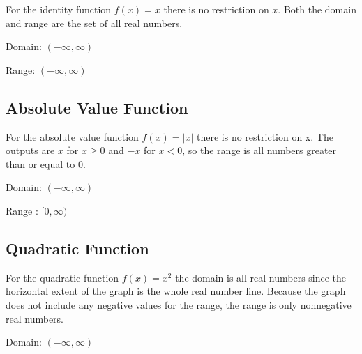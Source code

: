 


For the identity function $f(x) = x$ there is no restriction on $x$. Both the domain and
range are the set of all real numbers.



Domain: $( -\infty ,\infty )$



Range: $( -\infty ,\infty )$




\subsection{Absolute Value Function}
\label{sss:abso-ffeb}







For the absolute value function $f(x) = |x|$ there is no restriction on x. The outputs are
$x$ for $x\ge 0$ and $-x$ for $x < 0$, so the range is all numbers greater than or equal
to 0.



Domain: $( -\infty ,\infty )$



Range : $[0 ,\infty )$




\subsection{Quadratic Function}
\label{sss:quad-a21f}







For the quadratic function $f(x) = x^2$ the domain is all real numbers since the
horizontal extent of the graph is the whole real number line. Because the graph does not
include any negative values for the range, the range is only nonnegative real numbers.



Domain: $( -\infty ,\infty )$



